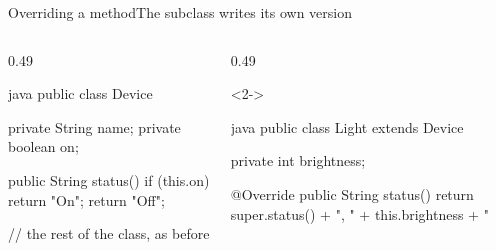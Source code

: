 \documentclass[\deckoptions]{beamer}
\begin{document}
\begin{frame}[fragile]{Overriding a method}{The subclass writes its own version}
  \begin{columns}[T, onlytextwidth]
    \begin{column}{0.49\textwidth}
\begin{codeblock}[steps={||5|5-10|5|}, dense, marks={5/3, 5-10/4/info/2, 5/5/info/3}]{java}
public class Device {
    private String name;
    private boolean on;

    public String status() {
        if (this.on) {
            return "On";
        }
        return "Off";
    }

    // the rest of the class, as before
}
\end{codeblock}
    \end{column}
    \begin{column}{0.49\textwidth}
      \begin{uncoverenv}<2->
\begin{codeblock}[steps={||5|6|4|}, dense, marks={5/3, 6/4, 4/5}]{java}
public class Light extends Device {
    private int brightness;

    @Override
    public String status() {
        return super.status() + ", " + this.brightness + "%
    }

}
\end{codeblock}
\end{uncoverenv}
\end{column}
\end{columns}
\end{frame}
\end{document}
